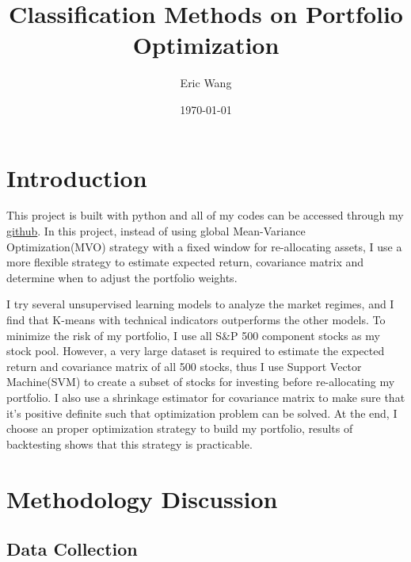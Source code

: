 \documentclass[a4paper,12pt]{article}
\title{Classification Methods on Portfolio Optimization}
\author{Eric Wang}
\date{\today}
\begin{document}
\maketitle

\section{Introduction}

This project is built with python and all of my codes can be accessed through my \href{https://github.com/ywang408/ml_portfolio_optimization}{github}. In this project, instead of using global Mean-Variance Optimization(MVO) strategy with a fixed window for re-allocating assets, I use a more flexible strategy to estimate expected return, covariance matrix and determine when to adjust the portfolio weights.

I try several unsupervised learning models to analyze the market regimes, and I find that K-means with technical indicators outperforms the other models. To minimize the risk of my portfolio, I use all S\&P 500 component stocks as my stock pool. However, a very large dataset is required to estimate the expected return and covariance matrix of all 500 stocks, thus I use Support Vector Machine(SVM) to create a subset of stocks for investing before re-allocating my portfolio. I also use a shrinkage estimator for covariance matrix to make sure that it's positive definite such that optimization problem can be solved. At the end, I choose an proper optimization strategy to build my portfolio, results of backtesting shows that this strategy is practicable.


\section{Methodology Discussion}\label{Methodology}

\subsection{Data Collection}
  
\end{document}
